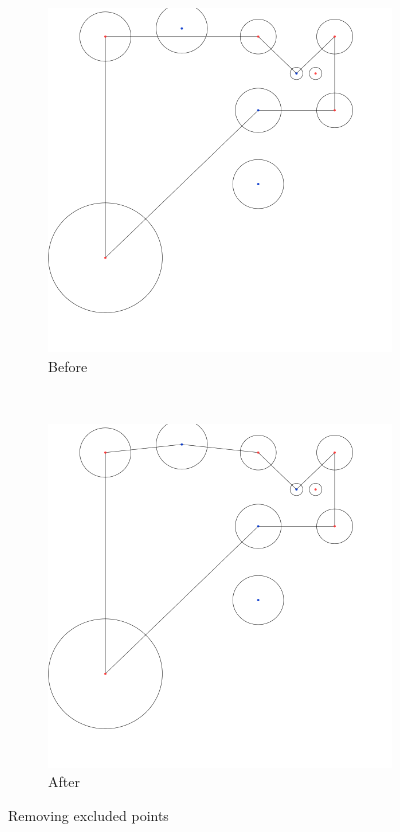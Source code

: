 \documentclass[paper=a4, fontsize=11pt]{scrartcl} %
\numberwithin{equation}{section} %
\numberwithin{figure}{section} %
\numberwithin{table}{section} %
\begin{document}
\begin{figure}
        \centering
        \begin{subfigure}[b]{0.4\textwidth}
                \includegraphics[width=\textwidth]{radii}
                \caption{Before}
        \end{subfigure}%
        ~ %
        \begin{subfigure}[b]{0.4\textwidth}
                \includegraphics[width=\textwidth]{fixed_hull}
                \caption{After}
        \end{subfigure}
        \caption{Removing excluded points}\label{fig:fixed_hull}
\end{figure}
\end{document}
